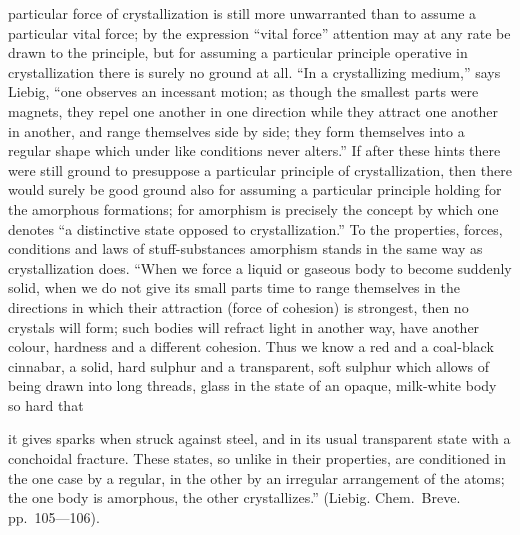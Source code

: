 \documentclass[12pt,a4paper]{book}
\begin{document}
particular force of crystallization is still more unwarranted than to assume a
particular vital force; by the expression ``vital force'' attention may at any
rate be drawn to the principle, but for assuming a particular principle
operative in crystallization there is surely no ground at all. ``In a
crystallizing medium,'' says Liebig, ``one observes an incessant motion; as
though the smallest parts were magnets, they repel one another in one direction
while they attract one another in another, and range themselves side by side;
they form themselves into a regular shape which under like conditions never
alters.'' If after these hints there were still ground to presuppose a
particular principle of crystallization, then there would surely be good ground
also for assuming a particular principle holding for the amorphous formations;
for amorphism is precisely the concept by which one denotes ``a distinctive
state opposed to crystallization.'' To the properties, forces, conditions and
laws of stuff-substances amorphism stands in the same way as crystallization
does. ``When we force a liquid or gaseous body to become suddenly solid, when
we do not give its small parts time to range themselves in the directions in
which their attraction (force of cohesion) is strongest, then no crystals will
form; such bodies will refract light in another way, have another colour,
hardness and a different cohesion. Thus we know a red and a coal-black
cinnabar, a solid, hard sulphur and a transparent, soft sulphur which allows of
being drawn into long threads, glass in the state of an opaque, milk-white body
so hard that

\setcounter{footnote}{0}
it gives sparks when struck against steel, and in its usual transparent state
with a conchoidal fracture. These states, so unlike in their properties, are
conditioned in the one case by a regular, in the other by an irregular
arrangement of the atoms; the one body is amorphous, the other crystallizes.''
(Liebig. Chem.\ Breve. pp.~105---106).
\end{document}
